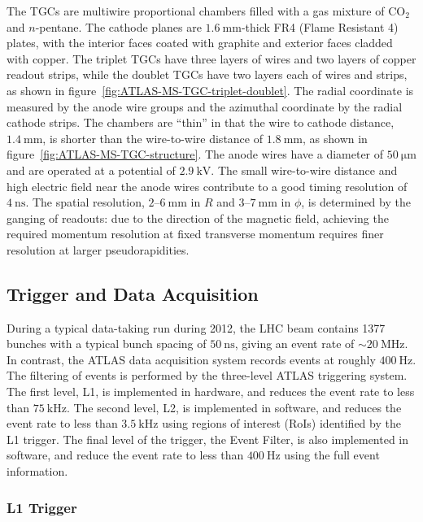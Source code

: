 The TGCs are multiwire proportional chambers filled with a gas mixture of CO$_2$ and $n$-pentane. The cathode planes are $\SI{1.6}{\milli\meter}$-thick FR4 (Flame Resistant 4) plates, with the interior faces coated with graphite and exterior faces cladded with copper. The triplet TGCs have three layers of wires and two layers of copper readout strips, while the doublet TGCs have two layers each of wires and strips, as shown in figure~\ref{fig:ATLAS-MS-TGC-triplet-doublet}. The radial coordinate is measured by the anode wire groups and the azimuthal coordinate by the radial cathode strips. The chambers are ``thin'' in that the wire to cathode distance, $\SI{1.4}{\milli\meter}$, is shorter than the wire-to-wire distance of $\SI{1.8}{\milli\meter}$, as shown in figure~\ref{fig:ATLAS-MS-TGC-structure}. The anode wires have a diameter of $\SI{50}{\micro\meter}$ and are operated at a potential of $\SI{2.9}{\kilo\volt}$. The small wire-to-wire distance and high electric field near the anode wires contribute to a good timing resolution of $\SI{4}{\nano\second}$. The spatial resolution, $2$--$\SI{6}{\milli\meter}$ in $R$ and $3$--$\SI{7}{\milli\meter}$ in $\phi$, is determined by the ganging of readouts: due to the direction of the magnetic field, achieving the required momentum resolution at fixed transverse momentum requires finer resolution at larger pseudorapidities. 


\subsection{Trigger and Data Acquisition}
During a typical data-taking run during 2012, the LHC beam contains 1377 bunches with a typical bunch spacing of $\SI{50}{\nano\second}$, giving an event rate of $\sim \SI{20}{\mega\hertz}$. In contrast, the ATLAS data acquisition system records events at roughly $\SI{400}{\hertz}$. The filtering of events is performed by the three-level ATLAS triggering system. The first level, L1, is implemented in hardware, and reduces the event rate to less than $\SI{75}{\kilo\hertz}$. The second level, L2, is implemented in software, and reduces the event rate to less than $\SI{3.5}{\kilo\hertz}$ using regions of interest (RoIs) identified by the L1 trigger. The final level of the trigger, the Event Filter, is also implemented in software, and reduce the event rate to less than $\SI{400}{\hertz}$ using the full event information. 

\subsubsection{L1 Trigger}\label{sec:experiment-trigger-L1}

